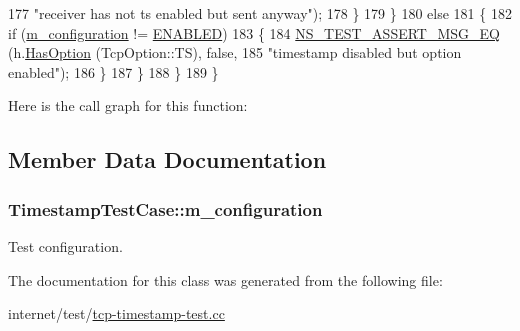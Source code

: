 \begin{DoxyCode}
177                                      \textcolor{stringliteral}{"receiver has not ts enabled but sent anyway"});
178             \}
179         \}
180       \textcolor{keywordflow}{else}
181         \{
182           \textcolor{keywordflow}{if} (\hyperlink{classTimestampTestCase_a23ae1fc181bfd5b913f6b8219349e23c}{m\_configuration} != \hyperlink{classTimestampTestCase_a98399735307f2da16757d48f88ebbd6aad00a02cea964b70034eb6324f29bb891}{ENABLED})
183             \{
184               \hyperlink{group__testing_ga2a9d78cffb3db8e867c35fff0b698cf5}{NS\_TEST\_ASSERT\_MSG\_EQ} (h.\hyperlink{classns3_1_1TcpHeader_aacc07bdab91925f1cddf9bcb1ae91d13}{HasOption} (TcpOption::TS), \textcolor{keyword}{false},
185                                      \textcolor{stringliteral}{"timestamp disabled but option enabled"});
186             \}
187         \}
188     \}
189 \}
\end{DoxyCode}


Here is the call graph for this function\+:




\subsection{Member Data Documentation}
\subsubsection[{\texorpdfstring{m\+\_\+configuration}{m_configuration}}]{ Timestamp\+Test\+Case\+::m\+\_\+configuration\hspace{0.3cm}{\ttfamily [protected]}}\hypertarget{classTimestampTestCase_a23ae1fc181bfd5b913f6b8219349e23c}{}\label{classTimestampTestCase_a23ae1fc181bfd5b913f6b8219349e23c}


Test configuration. 



The documentation for this class was generated from the following file\+:\begin{DoxyCompactItemize}
\item 
internet/test/\hyperlink{tcp-timestamp-test_8cc}{tcp-\/timestamp-\/test.\+cc}\end{DoxyCompactItemize}
